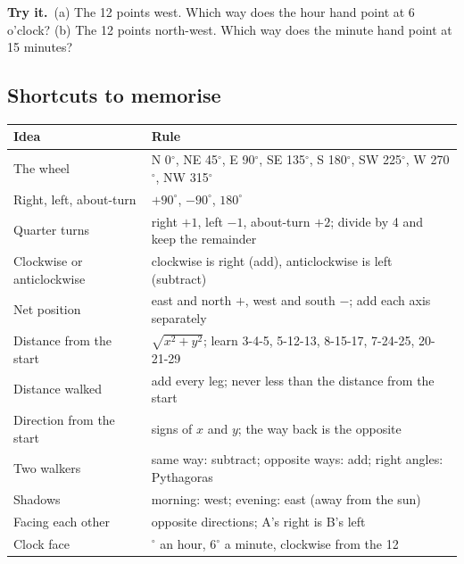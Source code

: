 \documentclass[11pt,a4paper]{article}
\let\oldsubsection\subsection
\renewcommand{\subsection}{\needspace{9\baselineskip}\oldsubsection}
\newcommand{\tryit}[1]{\textbf{\color{ember}Try it.}\ #1}
\begin{document}
\tryit (a) The 12 points west. Which way does the hour hand point at 6 o'clock? (b) The 12 points north-west. Which way does the minute hand point at 15 minutes?

\subsection*{Shortcuts to memorise}
\begin{center}\small\renewcommand{\arraystretch}{1.9}\setlength{\tabcolsep}{8pt}
\begin{tabularx}{\linewidth}{@{}>{\raggedright\arraybackslash}X>{\raggedright\arraybackslash}X@{}}
\toprule
\textbf{\color{slate}Idea} & \textbf{\color{slate}Rule} \\ \midrule
The wheel & N 0$^\circ$, NE 45$^\circ$, E 90$^\circ$, SE 135$^\circ$, S 180$^\circ$, SW 225$^\circ$, W 270$^\circ$, NW 315$^\circ$ \\
Right, left, about-turn & $+90^\circ$, $-90^\circ$, $180^\circ$ \\
Quarter turns & right $+1$, left $-1$, about-turn $+2$; divide by 4 and keep the remainder \\
Clockwise or anticlockwise & clockwise is right (add), anticlockwise is left (subtract) \\
Net position & east and north $+$, west and south $-$; add each axis separately \\
Distance from the start & $\sqrt{x^2+y^2}$; learn 3-4-5, 5-12-13, 8-15-17, 7-24-25, 20-21-29 \\
Distance walked & add every leg; never less than the distance from the start \\
Direction from the start & signs of $x$ and $y$; the way back is the opposite \\
Two walkers & same way: subtract; opposite ways: add; right angles: Pythagoras \\
Shadows & morning: west; evening: east (away from the sun) \\
Facing each other & opposite directions; A's right is B's left \\
Clock face & 30$^\circ$ an hour, 6$^\circ$ a minute, clockwise from the 12 \\
\bottomrule
\end{tabularx}\end{center}
\end{document}
